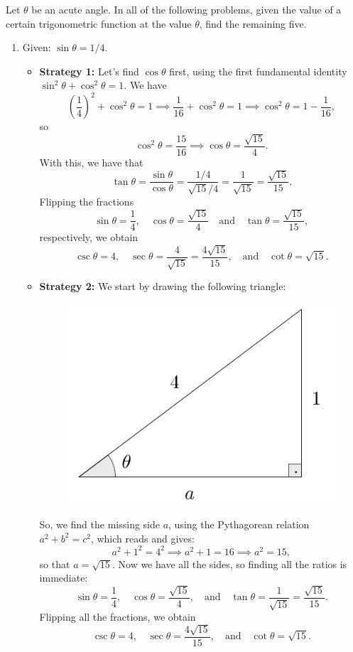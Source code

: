\documentclass{ximera}
\begin{document}
\begin{example}
  Let $\theta$ be an acute angle. In all of the following problems, given the value of a certain trigonometric function at the value $\theta$, find the remaining five.
  \begin{enumerate}[label=\alph*.]
  \item Given: $\sin\theta = 1/4$.

    \begin{explanation}
      \begin{itemize}
      \item {\bf Strategy 1:}      Let's find $\cos\theta$ first, using the first fundamental identity $\sin^2\theta+\cos^2\theta=1$. We have $$\left(\frac{1}{4}\right)^2 + \cos^2\theta=1 \implies \frac{1}{16}+\cos^2\theta=1 \implies \cos^2\theta = 1-\frac{1}{16},$$so $$\cos^2\theta = \frac{15}{16} \implies \cos\theta = \frac{\sqrt{15}}{4}.$$ With this, we have that \[   \tan\theta = \frac{\sin\theta}{\cos\theta} = \frac{1/4}{\sqrt{15}/4} = \frac{1}{\sqrt{15}} = \frac{\sqrt{15}}{15}.  \]Flipping the fractions $$\sin\theta = \frac{1}{4}, \quad \cos\theta = \frac{\sqrt{15}}{4} \quad\mbox{and}\quad \tan\theta = \frac{\sqrt{15}}{15},$$respectively, we obtain $$\csc\theta = 4, \quad \sec\theta = \frac{4}{\sqrt{15}} = \frac{4\sqrt{15}}{15},\quad\mbox{and}\quad \cot\theta = \sqrt{15}.$$

      \item {\bf Strategy 2:}  We start by drawing the following triangle:
        \begin{figure}[h]
          \centering
          \includegraphics[scale=.3]{./figures/9-1-3-triangle-sin-1-4.png}
        \end{figure}
        So, we find the missing side $a$, using the Pythagorean relation $a^2+b^2=c^2$, which reads and gives: $$a^2+1^2 = 4^2 \implies a^2+1=16\implies a^2=15,$$so that $a=\sqrt{15}$. Now we have all the sides, so finding all the ratios is immediate: $$\sin\theta = \frac{1}{4},\quad \cos\theta=\frac{\sqrt{15}}{4},\quad\mbox{and}\quad\tan\theta=\frac{1}{\sqrt{15}}=\frac{\sqrt{15}}{15}.$$Flipping all the fractions, we obtain$$\csc\theta = 4,\quad \sec\theta=\frac{4\sqrt{15}}{15},\quad\mbox{and}\quad\cot\theta=\sqrt{15}.$$
      \end{itemize}
    \end{explanation}
    

\end{enumerate}
\end{example}
\end{document}
